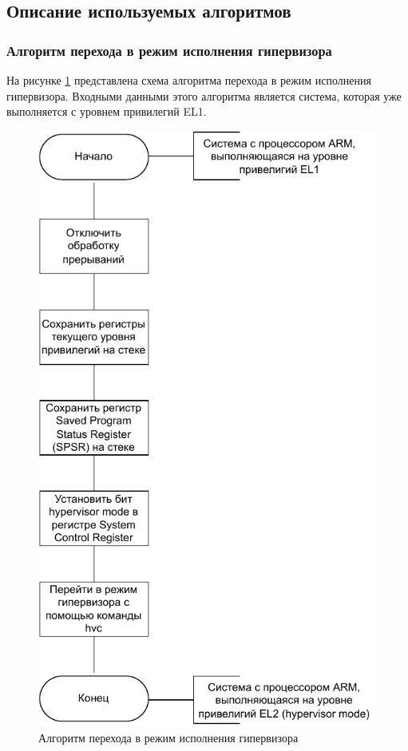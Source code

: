 \subsection{Описание используемых алгоритмов}

\subsubsection{Алгоритм перехода в режим исполнения гипервизора}

На рисунке \ref{fig:algo-1} представлена схема алгоритма перехода в режим исполнения гипервизора. Входными данными этого алгоритма является система, которая уже выполняется с уровнем привилегий EL1.

\begin{figure}[h]
	\centering
	\includegraphics[scale=1.3]{img/algo1.pdf}
	\caption{Алгоритм перехода в режим исполнения гипервизора}
	\label{fig:algo-1}
\end{figure}

\pagebreak
